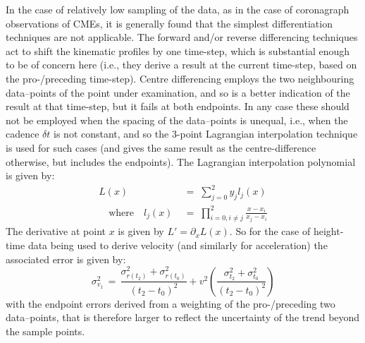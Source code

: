 \documentclass[structabstract]{aa}
\begin{document}
In the case of relatively low sampling of the data, as in the case of coronagraph observations of CMEs, it is generally found that the simplest differentiation techniques are not applicable. The forward and/or reverse differencing techniques act to shift the kinematic profiles by one time-step, which is substantial enough to be of concern here (i.e., they derive a result at the current time-step, based on the pro-/preceding time-step). Centre differencing employs the two neighbouring data--points of the point under examination, and so is a better indication of the result at that time-step, but it fails at both endpoints. In any case these should not be employed when the spacing of the data--points is unequal, i.e., when the cadence $\delta t$ is not constant, and so the 3-point Lagrangian interpolation technique is used for such cases (and gives the same result as the centre-difference otherwise, but includes the endpoints). The Lagrangian interpolation polynomial is given by:
\begin{eqnarray}
L(x) \; &=\; \sum_{j=0}^2 y_j l_j(x) \\ \quad \mbox{where} \quad
l_j(x) \; &=\; \prod_{i=0, i\neq j}^2 \frac{x-x_i}{x_j-x_i} 
\end{eqnarray}
The derivative at point $x$ is given by $L'=\partial_x L(x)$. So for the case of height-time data being used to derive velocity (and similarly for acceleration) the associated error is given by:
\begin{equation}
\sigma_{v_1}^2 \,=\, \frac{\sigma_{r(t_2)}^2+\sigma_{r(t_0)}^2}{(t_2-t_0)^2} + v^2 \left( \frac{\sigma_{t_2}^2+\sigma_{t_0}^2}{(t_2-t_0)^2} \right)
\label{vel_err}
\end{equation}
with the endpoint errors derived from a weighting of the pro-/preceding two data--points, that is therefore larger to reflect the uncertainty of the trend beyond the sample points.
\end{document}
